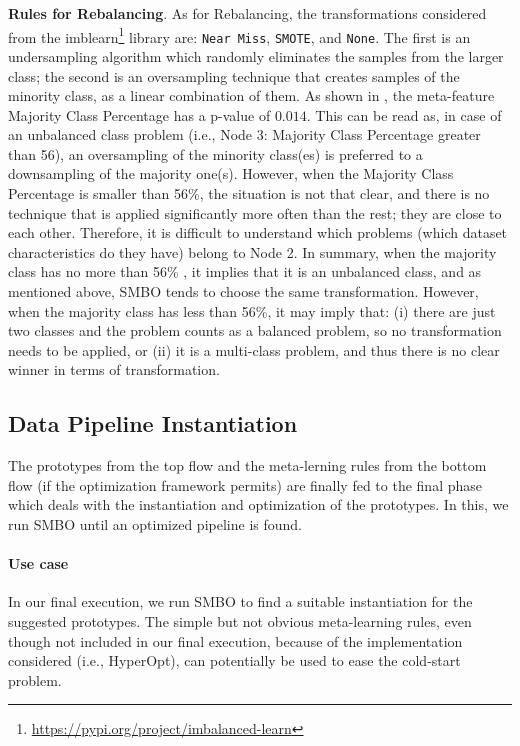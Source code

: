 \textbf{Rules for Rebalancing}. As for Rebalancing, the transformations considered from the imblearn\footnote{\url{https://pypi.org/project/imbalanced-learn}} library are: \texttt{Near Miss}, \texttt{SMOTE}, and \texttt{None}.
The first is an undersampling algorithm which randomly eliminates the samples from the larger class; the second is an oversampling technique that creates samples of the minority class, as a linear combination of them.
As shown in , the meta-feature Majority Class Percentage has a p-value of $0.014$.
This can be read as, in case of an unbalanced class problem (i.e., Node 3: Majority Class Percentage greater than 56), an oversampling of the minority class(es) is preferred to a downsampling of the majority one(s).
However, when the Majority Class Percentage is smaller than 56\%, the situation is not that clear, and there is no technique that is applied significantly more often than the rest; they are close to each other.
Therefore, it is difficult to understand which problems (which dataset characteristics do they have) belong to Node 2.
In summary, when the majority class has no more than 56\% , it implies that it is an unbalanced class, and as mentioned above, SMBO tends to choose the same transformation.
However, when the majority class has less than 56\%, it may imply that: (i) there are just two classes and the problem counts as a balanced problem, so no transformation needs to be applied, or (ii) it is a multi-class problem, and thus there is no clear winner in terms of transformation.

\subsection{Data Pipeline Instantiation}
\label{effective-ssec:prototype-insta}

The prototypes from the top flow and the meta-lerning rules from the bottom flow (if the optimization framework permits) are finally fed to the final phase which deals with the instantiation and optimization of the prototypes. In this, we run SMBO until an optimized pipeline is found.

\paragraph{Use case}
 In our final execution, we run SMBO to find a suitable instantiation for the suggested prototypes. The simple but not obvious meta-learning rules, even though not included in our final execution, because of the implementation considered (i.e., HyperOpt), can potentially be used to ease the cold-start problem.


